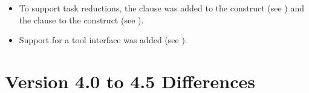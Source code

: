 \begin{itemize}
\item To support task reductions, the 
clause was added to the  construct (see ) and the 
clause to the  construct (see ).

\item Support for a tool interface was added (see ).

\end{itemize}


\section{Version 4.0 to 4.5 Differences}
\label{sec:Version 4.0 to 4.5 Differences}
